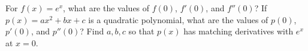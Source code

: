 For $f(x)=e^x$, what are the values of $f(0)$, $f'(0)$, and $f''(0)$?  If $p(x)=ax^2 + bx+c$ is a quadratic polynomial, what are the values of $p(0)$, $p'(0)$, and $p''(0)$?  Find $a,b,c$ so that $p(x)$ has matching derivatives with $e^x$ at $x=0$.